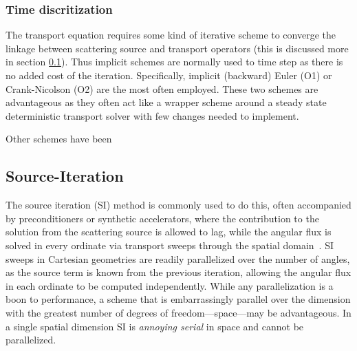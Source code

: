 


\subsubsection{Time discritization}
The transport equation requires some kind of iterative scheme to converge the linkage between scattering source and transport operators (this is discussed more in section \ref{sec:intro_itterative-scheme}).
Thus implicit schemes are normally used to time step as there is no added cost of the iteration.
Specifically, implicit (backward) Euler (O1) or Crank-Nicolson (O2) are the most often employed.
These two schemes are advantageous as they often act like a wrapper scheme around a steady state deterministic transport solver with few changes needed to implement.


Other schemes have been 



\subsection{Source-Iteration}
\label{sec:intro_itterative-scheme}

The source iteration (SI) method is commonly used to do this, often accompanied by preconditioners or synthetic accelerators, where the contribution to the solution from the scattering source is allowed to lag, while the angular flux is solved in every ordinate via transport sweeps through the spatial domain~\citep{adams_subcell_1997}.
SI sweeps in Cartesian geometries are readily parallelized over the number of angles, as the source term is known from the previous iteration, allowing the angular flux in each ordinate to be computed independently. 
While any parallelization is a boon to performance, a scheme that is embarrassingly parallel over the dimension with the greatest number of degrees of freedom---space---may be advantageous.
In a single spatial dimension SI is \textit{annoying serial} in space and cannot be parallelized.

